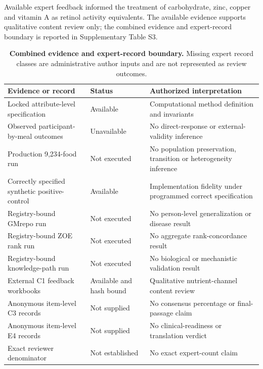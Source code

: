 Available expert feedback informed the treatment of carbohydrate, zinc, copper
and vitamin A as retinol activity equivalents. The available evidence supports
qualitative content review only; the combined evidence and expert-record
boundary is reported in Supplementary Table S3.

\begin{table}[t]
\caption{\textbf{Combined evidence and expert-record boundary.} Missing
expert record classes are administrative author inputs and are not represented
as review outcomes.}
\label{tab:supp_evidence_expert_boundary}
\centering
\begin{tabular}{p{} p{} p{}}
\toprule
Evidence or record & Status & Authorized interpretation \\
\midrule
Locked attribute-level specification & Available & Computational method definition and invariants \\
Observed participant-by-meal outcomes & Unavailable & No direct-response or external-validity inference \\
Production 9,234-food run & Not executed & No population preservation, transition or heterogeneity inference \\
Correctly specified synthetic positive-control & Available & Implementation fidelity under programmed correct specification \\
Registry-bound GMrepo run & Not executed & No person-level generalization or disease result \\
Registry-bound ZOE rank run & Not executed & No aggregate rank-concordance result \\
Registry-bound knowledge-path run & Not executed & No biological or mechanistic validation result \\
External C1 feedback workbooks & Available and hash bound & Qualitative nutrient-channel content review \\
Anonymous item-level C3 records & Not supplied & No consensus percentage or final-passage claim \\
Anonymous item-level E4 records & Not supplied & No clinical-readiness or translation verdict \\
Exact reviewer denominator & Not established & No exact expert-count claim \\
\bottomrule
\end{tabular}
\end{table}
